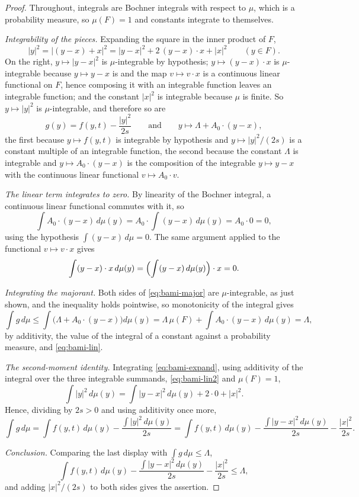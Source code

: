 \begin{proof}
Throughout, integrals are Bochner integrals with respect to $\mu$, which is a
probability measure, so $\mu(F)=1$ and constants integrate to themselves.

\emph{Integrability of the pieces.}
Expanding the square in the inner product of $F$,
\begin{equation}\label{eq:bami-expand}
  |y|^2=|(y-x)+x|^2=|y-x|^2+2\,(y-x)\cdot x+|x|^2\qquad(y\in F).
\end{equation}
On the right, $y\mapsto|y-x|^2$ is $\mu$-integrable by hypothesis;
$y\mapsto(y-x)\cdot x$ is $\mu$-integrable because $y\mapsto y-x$ is and the map
$v\mapsto v\cdot x$ is a continuous linear functional on $F$, hence composing it
with an integrable function leaves an integrable function; and the constant
$|x|^2$ is integrable because $\mu$ is finite. So $y\mapsto|y|^2$ is
$\mu$-integrable, and therefore so are
\[
  g(y)=f(y,t)-\frac{|y|^2}{2s}
  \qquad\text{and}\qquad
  y\longmapsto\Lambda+A_0\cdot(y-x),
\]
the first because $y\mapsto f(y,t)$ is integrable by hypothesis and
$y\mapsto|y|^2/(2s)$ is a constant multiple of an integrable function, the second
because the constant $\Lambda$ is integrable and $y\mapsto A_0\cdot(y-x)$ is the
composition of the integrable $y\mapsto y-x$ with the continuous linear
functional $v\mapsto A_0\cdot v$.

\emph{The linear term integrates to zero.}
By linearity of the Bochner integral, a continuous linear functional commutes
with it, so
\begin{equation}\label{eq:bami-lin}
  \int A_0\cdot(y-x)\,d\mu(y)=A_0\cdot\int(y-x)\,d\mu(y)=A_0\cdot0=0 ,
\end{equation}
using the hypothesis $\int(y-x)\,d\mu=0$. The same argument applied to the
functional $v\mapsto v\cdot x$ gives
\begin{equation}\label{eq:bami-lin2}
  \int(y-x)\cdot x\,d\mu(y)=\Bigl(\int(y-x)\,d\mu(y)\Bigr)\cdot x=0 .
\end{equation}

\emph{Integrating the majorant.}
Both sides of \eqref{eq:bami-major} are $\mu$-integrable, as just shown, and the
inequality holds pointwise, so monotonicity of the integral gives
\[
  \int g\,d\mu\le\int\bigl(\Lambda+A_0\cdot(y-x)\bigr)d\mu(y)
   =\Lambda\,\mu(F)+\int A_0\cdot(y-x)\,d\mu(y)=\Lambda ,
\]
by additivity, the value of the integral of a constant against a probability
measure, and \eqref{eq:bami-lin}.

\emph{The second-moment identity.}
Integrating \eqref{eq:bami-expand}, using additivity of the integral over the
three integrable summands, \eqref{eq:bami-lin2} and $\mu(F)=1$,
\[
  \int|y|^2\,d\mu(y)=\int|y-x|^2\,d\mu(y)+2\cdot0+|x|^2 .
\]
Hence, dividing by $2s>0$ and using additivity once more,
\[
  \int g\,d\mu=\int f(y,t)\,d\mu(y)-\frac{\int|y|^2\,d\mu(y)}{2s}
   =\int f(y,t)\,d\mu(y)-\frac{\int|y-x|^2\,d\mu(y)}{2s}-\frac{|x|^2}{2s}.
\]

\emph{Conclusion.}
Comparing the last display with $\int g\,d\mu\le\Lambda$,
\[
  \int f(y,t)\,d\mu(y)-\frac{\int|y-x|^2\,d\mu(y)}{2s}-\frac{|x|^2}{2s}
   \le\Lambda ,
\]
and adding $|x|^2/(2s)$ to both sides gives the assertion.
\end{proof}
